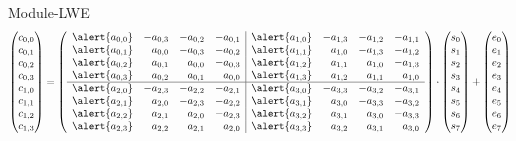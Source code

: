 \documentclass[xcolor=table,10pt,aspectratio=169]{beamer}
\begin{document}
\begin{frame}[label={sec:org27a709f}]{Module-LWE}
\[
\begin{pmatrix}c_{0,0} \\ c_{0,1} \\ c_{0,2} \\ c_{0,3} \\ c_{1,0} \\ c_{1,1} \\ c_{1,2} \\ c_{1,3}\end{pmatrix} = 
\left(\begin{array}{rrrr|rrrr}
\alert{a_{0,0}} & -a_{0,3} & -a_{0,2} & -a_{0,1} & \alert{a_{1,0}} & -a_{1,3} & -a_{1,2} & -a_{1,1} \\
\alert{a_{0,1}} &  a_{0,0} & -a_{0,3} & -a_{0,2} & \alert{a_{1,1}} &  a_{1,0} & -a_{1,3} & -a_{1,2} \\
\alert{a_{0,2}} &  a_{0,1} &  a_{0,0} & -a_{0,3} & \alert{a_{1,2}} &  a_{1,1} &  a_{1,0} & -a_{1,3} \\
\alert{a_{0,3}} &  a_{0,2} &  a_{0,1} &  a_{0,0} & \alert{a_{1,3}} &  a_{1,2} &  a_{1,1} &  a_{1,0} \\
\hline
\alert{a_{2,0}} & -a_{2,3} & -a_{2,2} & -a_{2,1} & \alert{a_{3,0}} & -a_{3,3} & -a_{3,2} & -a_{3,1} \\
\alert{a_{2,1}} &  a_{2,0} & -a_{2,3} & -a_{2,2} & \alert{a_{3,1}} &  a_{3,0} & -a_{3,3} & -a_{3,2} \\
\alert{a_{2,2}} &  a_{2,1} &  a_{2,0} & -a_{2,3} & \alert{a_{3,2}} &  a_{3,1} &  a_{3,0} & -a_{3,3} \\
\alert{a_{2,3}} &  a_{2,2} &  a_{2,1} &  a_{2,0} & \alert{a_{3,3}} &  a_{3,2} &  a_{3,1} &  a_{3,0} \\
\end{array}\right)\cdot
\begin{pmatrix}s_{0} \\ s_{1} \\ s_{2} \\ s_{3} \\ s_{4} \\ s_{5} \\ s_{6} \\ s_{7}\end{pmatrix} +
\begin{pmatrix}e_{0} \\ e_{1} \\ e_{2} \\ e_{3} \\ e_{4} \\ e_{5} \\ e_{6} \\ e_{7}\end{pmatrix}
\]
\end{frame}
\end{document}
